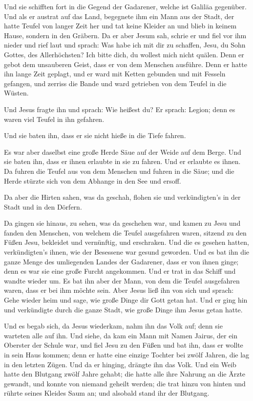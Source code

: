  Und sie schifften fort in die Gegend der Gadarener,
welche ist Galiläa gegenüber.  Und als er austrat auf das
Land, begegnete ihm ein Mann aus der Stadt, der hatte Teufel von langer
Zeit her und tat keine Kleider an und blieb in keinem Hause, sondern in
den Gräbern.  Da er aber Jesum sah, schrie er und fiel
vor ihm nieder und rief laut und sprach: Was habe ich mit dir zu
schaffen, Jesu, du Sohn Gottes, des Allerhöchsten? Ich bitte dich, du
wollest mich nicht quälen.  Denn er gebot dem unsauberen
Geist, dass er von dem Menschen ausführe. Denn er hatte ihn lange Zeit
geplagt, und er ward mit Ketten gebunden und mit Fesseln gefangen, und
zerriss die Bande und ward getrieben von dem Teufel in die Wüsten.

 Und Jesus fragte ihn und sprach: Wie heißest du? Er
sprach: Legion; denn es waren viel Teufel in ihn gefahren.

 Und sie baten ihn, dass er sie nicht hieße in die Tiefe
fahren.

 Es war aber daselbst eine große Herde Säue auf der Weide
auf dem Berge. Und sie baten ihn, dass er ihnen erlaubte in sie zu
fahren. Und er erlaubte es ihnen.  Da fuhren die Teufel
aus von dem Menschen und fuhren in die Säue; und die Herde stürzte sich
von dem Abhange in den See und ersoff.

 Da aber die Hirten sahen, was da geschah, flohen sie und
verkündigten's in der Stadt und in den Dörfern.

 Da gingen sie hinaus, zu sehen, was da geschehen war,
und kamen zu Jesu und fanden den Menschen, von welchem die Teufel
ausgefahren waren, sitzend zu den Füßen Jesu, bekleidet und vernünftig,
und erschraken.  Und die es gesehen hatten,
verkündigten's ihnen, wie der Besessene war gesund geworden.
 Und es bat ihn die ganze Menge des umliegenden Landes
der Gadarener, dass er von ihnen ginge; denn es war sie eine große
Furcht angekommen. Und er trat in das Schiff und wandte wieder um.
 Es bat ihn aber der Mann, von dem die Teufel ausgefahren
waren, dass er bei ihm möchte sein. Aber Jesus ließ ihn von sich und
sprach:  Gehe wieder heim und sage, wie große Dinge dir
Gott getan hat. Und er ging hin und verkündigte durch die ganze Stadt,
wie große Dinge ihm Jesus getan hatte.

 Und es begab sich, da Jesus wiederkam, nahm ihn das Volk
auf; denn sie warteten alle auf ihn.  Und siehe, da kam
ein Mann mit Namen Jairus, der ein Oberster der Schule war, und fiel
Jesu zu den Füßen und bat ihn, dass er wollte in sein Haus kommen;
 denn er hatte eine einzige Tochter bei zwölf Jahren, die
lag in den letzten Zügen. Und da er hinging, drängte ihn das Volk.
 Und ein Weib hatte den Blutgang zwölf Jahre gehabt; die
hatte alle ihre Nahrung an die Ärzte gewandt, und konnte von niemand
geheilt werden;  die trat hinzu von hinten und rührte
seines Kleides Saum an; und alsobald stand ihr der Blutgang.

